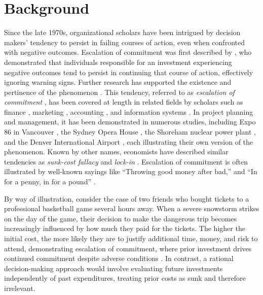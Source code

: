 \documentclass{article}
\begin{document}
\section{Background}

Since the late 1970s, organizational scholars have been intrigued by decision makers’ tendency to persist in failing courses of action, even when confronted with negative outcomes. Escalation of commitment was first described by \cite{Staw-1976}, who demonstrated that individuals responsible for an investment experiencing negative outcomes tend to persist in continuing that course of action, effectively ignoring warning signs. Further research has supported the existence and pertinence of the phenomenon \cite{Brockner-1992, Shapira-1997, Sleesman-2012, Drummond-2017, Drummond-2014, Salter-2013}. This tendency, referred to as \textit{escalation of commitment} \cite{Staw-1976}, has been covered at length in related fields by scholars such as finance \cite{Schulz-Cheng-2002}, marketing \cite{Schmidt-Calantone-2002}, accounting \cite{Jeffrey-1992}, and information systems \cite{Heng-2003}. In project planning and management, it has been demonstrated in numerous studies, including Expo 86 in Vancouver \cite{Ross-1986}, the Sydney Opera House \cite{flyvbjerg-2009}, the Shoreham nuclear power plant \cite{Ross-1993}, and the Denver International Airport \cite{Montealegre-2000}, each illustrating their own version of the phenomenon. Known by other names, economists have described similar tendencies as \textit{sunk-cost fallacy} \cite{Arkes-1985, Berg-2009} and \textit{lock-in} \cite{Cantarelli-2010}. Escalation of commitment is often illustrated by well-known sayings like ``Throwing good money after bad,'' and ``In for a penny, in for a pound'' \cite{Flyvbjerg-2021}.

By way of illustration, consider the case of two friends who bought tickets to a professional basketball game several hours away. When a severe snowstorm strikes on the day of the game, their decision to make the dangerous trip becomes increasingly influenced by how much they paid for the tickets. The higher the initial cost, the more likely they are to justify additional time, money, and risk to attend, demonstrating escalation of commitment, where prior investment drives continued commitment despite adverse conditions \cite{Thaler-2016}. In contrast, a rational decision-making approach would involve evaluating future investments independently of past expenditures, treating prior costs as sunk and therefore irrelevant.
\end{document}
